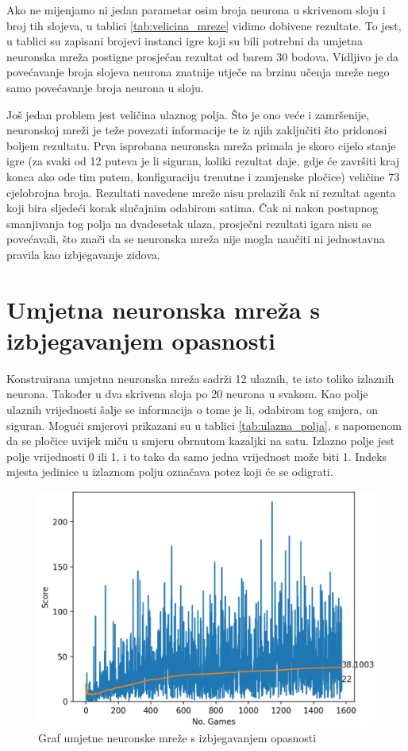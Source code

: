 \documentclass[zavrsnirad]{fer}
\begin{document}
Ako ne mijenjamo ni jedan parametar osim broja neurona u skrivenom sloju i broj tih slojeva, u tablici \ref{tab:velicina_mreze} vidimo dobivene rezultate. To jest, u tablici su zapisani brojevi instanci igre koji su bili potrebni da umjetna neuronska mreža postigne prosječan rezultat od barem 30 bodova. Vidljivo je da povećavanje broja slojeva neurona znatnije utječe na brzinu učenja mreže nego samo povećavanje broja neurona u sloju.

Još jedan problem jest veličina ulaznog polja. Što je ono veće i zamršenije, neuronskoj mreži je teže povezati informacije te iz njih zaključiti što pridonosi boljem rezultatu. Prva isprobana neuronska mreža primala je skoro cijelo stanje igre (za svaki od 12 puteva je li siguran, koliki rezultat daje, gdje će završiti kraj konca ako ode tim putem, konfiguraciju trenutne i zamjenske pločice) veličine 73 cjelobrojna broja. Rezultati navedene mreže nisu prelazili čak ni rezultat agenta koji bira sljedeći korak slučajnim odabirom satima. Čak ni nakon postupnog smanjivanja tog polja na dvadesetak ulaza, prosječni rezultati igara nisu se povećavali, što znači da se neuronska mreža nije mogla naučiti ni jednostavna pravila kao izbjegavanje zidova.



\section{Umjetna neuronska mreža s izbjegavanjem opasnosti}
\label{pog:neuronska_opasnost}
Konstruirana umjetna neuronska mreža sadrži 12 ulaznih, te isto toliko izlaznih neurona. Također u dva skrivena sloja po 20 neurona u svakom. Kao polje ulaznih vrijednosti šalje se informacija o tome je li, odabirom tog smjera, on siguran. Mogući smjerovi prikazani su u tablici \ref{tab:ulazna_polja}, s napomenom da se pločice uvijek miču u smjeru obrnutom kazaljki na satu. Izlazno polje jest polje vrijednosti 0 ili 1, i to tako da samo jedna vrijednost može biti 1. Indeks mjesta jedinice u izlaznom polju označava potez koji će se odigrati.


\begin{figure}[htb]
	\centering
	\includegraphics[width=0.58\linewidth]{Figures/neuronska1.png} 
	\caption{Graf umjetne neuronske mreže s izbjegavanjem opasnosti}
	\label{slk:neural_graph}
\end{figure}
\end{document}
